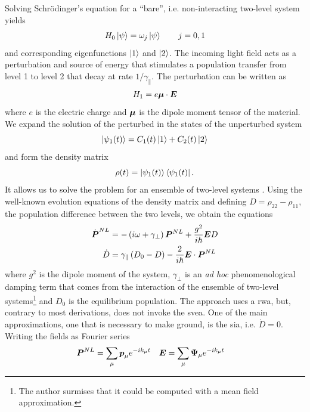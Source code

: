 Solving Schrödinger's equation for a ``bare'', i.e. non-interacting
two-level system yields
  \begin{equation}
   H_0\Ket{\psi}=\omega_j\Ket{\psi}	\qquad j=0,1
  \end{equation}
and corresponding eigenfunctions $\Ket{1}$ and $\Ket{2}$. 
The incoming light field acts as a perturbation and source of energy
that stimulates a population transfer from level 1 to level 2 that decay
at rate $1/\gamma_\parallel$. The perturbation can be written as
  \begin{equation}
   H_1 = e\boldsymbol{\mu}\cdot\boldsymbol{E}
  \end{equation}
where $e$ is the electric charge and $\boldsymbol{\mu}$ is the 
dipole moment tensor of the material.  We expand the solution 
of the perturbed in the states of the unperturbed system
  \begin{equation}
   \Ket{\psi_1(t)}=C_1(t)\Ket{1}+C_2(t)\Ket{2}
  \end{equation}
and form the density matrix
  \begin{equation}
   \rho(t) = \Ket{\psi_1(t)}\Bra{\psi_1(t)}.
  \end{equation}
It allows us to solve the problem for an ensemble
of two-level systems \cite{GE2010b}.
Using the well-known evolution equations of the density
matrix \cite[\S6.2]{BOY2008} and defining
$D=\rho_{22}-\rho_{11}$, the population difference between the two
levels,  we obtain the equations
\cite[\S5.3]{HAK1985b}
  \begin{align}
   \dot{\boldsymbol{P}}^{NL}	&= -\left(i\omega+\gamma_\perp\right)\boldsymbol{P}^{NL}+\frac{g^2}{i\hbar}\boldsymbol{E}D	\\
   \dot{D}				&= \gamma_\parallel\left(D_0-D\right)-\frac{2}{i\hbar}\boldsymbol{E}\cdot\boldsymbol{P}^{NL}
  \end{align}
where $g^2$ is the dipole moment of the system, 
$\gamma_\perp$ is an \textit{ad hoc} phenomenological damping
term that comes from the interaction of the ensemble of two-level systems\footnote{The author surmises that it 
could be computed with a mean field approximation.}
and $D_0$ is the equilibrium population. The approach 
uses a \gls{rwa}, but, contrary 
to most derivations, does not invoke the \gls{svea}. 
One of the main approximations, one that is necessary to make
ground, is the \gls{sia}, i.e. $\dot{D}=0$. Writing the fields
as Fourier series
	\begin{align*}
		\boldsymbol{P}^{NL}	&= \sum_{\mu}\boldsymbol{p}_\mu e^{-ik_\mu t}	&	\boldsymbol{E}	&= \sum_{\mu} \boldsymbol{\Psi}_\mu e^{-ik_\mu t}
	\end{align*}
